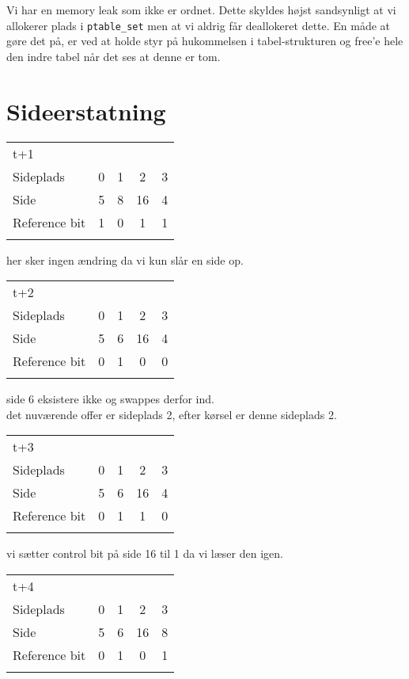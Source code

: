 \documentclass[titlepage]{article}
\begin{document}
Vi har en memory leak som ikke er ordnet. Dette skyldes højst sandsynligt at vi allokerer plads i
{\tt ptable\_set} men at vi aldrig får deallokeret dette. En måde at gøre det på, er ved at holde
styr på hukommelsen i tabel-strukturen og free'e hele den indre tabel når det ses at denne er tom.
\section{Sideerstatning}

\begin{tabular}{l | c | c | c | c}

t+1\\
Sideplads    & 0 & 1 & 2 & 3\\
Side         & 5 & 8 & 16 & 4\\
Reference bit & 1 & 0 & 1 & 1\\\\  
\end{tabular}

her sker ingen ændring da vi kun slår en side op.\\

\begin{tabular}{l | c | c | c | c}
t+2\\
Sideplads    & 0 & 1 & 2 & 3\\
Side         & 5 & 6 & 16 & 4\\
Reference bit & 0 & 1 & 0 & 0\\\\
\end{tabular}

side 6 eksistere ikke og swappes derfor ind.\\
det nuværende offer er sideplads 2, efter kørsel er denne sideplads 2.\\

\begin{tabular}{l | c | c | c | c}
t+3\\
Sideplads    & 0 & 1 & 2 & 3\\
Side         & 5 & 6 & 16 & 4\\
Reference bit & 0 & 1 & 1 & 0\\\\
\end{tabular}

vi sætter control bit på side 16 til 1 da vi læser den igen.\\


\begin{tabular}{l | c | c | c | c}
t+4\\
Sideplads    & 0 & 1 & 2 & 3\\
Side         & 5 & 6 & 16 & 8\\
Reference bit & 0 & 1 & 0 & 1\\\\
\end{tabular}
\end{document}
